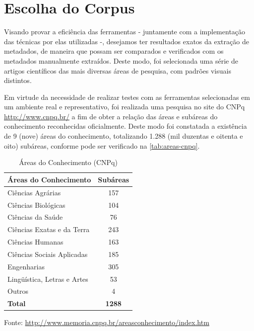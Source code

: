 \section{Escolha do Corpus}
\label{sec:corpus}


Visando provar a eficiência das ferramentas - juntamente com a implementação das técnicas por elas utilizadas -, desejamos ter resultados exatos da extração de metadados, de maneira que possam ser comparados e verificados com os metadados manualmente extraídos. Deste modo, foi selecionada uma série de artigos científicos das mais diversas áreas de pesquisa, com padrões visuais distintos.


Em virtude da necessidade de realizar testes com as ferramentas selecionadas em um ambiente real e representativo, foi realizada uma pesquisa no site do CNPq \url{http://www.cnpq.br/} a fim de obter a relação das áreas e subáreas do conhecimento reconhecidas oficialmente. Deste modo foi constatada a existência de 9 (nove) áreas do conhecimento, totalizando 1.288 (mil duzentas e oitenta e oito) subáreas, conforme pode ser verificado na \autoref{tab:areas-cnpq}.

\begin{table}
    \caption{Áreas do Conhecimento (CNPq)}
    \begin{center}
        \begin{tabular}{|l|c|}
            \hline 
            \textbf{Áreas do Conhecimento} & \textbf{Subáreas} \\ 
            \hline 
            Ciências Agrárias & 157 \\
            Ciências Biológicas & 104 \\
            Ciências da Saúde & 76 \\
            Ciências Exatas e da Terra & 243 \\
            Ciências Humanas & 163 \\
            Ciências Sociais Aplicadas & 185 \\
            Engenharias & 305 \\
            Lingüística, Letras e Artes & 53 \\
            Outros & 4 \\
            \hline
            \textbf{Total} & \textbf{1288} \\
            \hline
        \end{tabular}
    \end{center}
    \center\footnotesize{Fonte: \url{http://www.memoria.cnpq.br/areasconhecimento/index.htm}}
    \label{tab:areas-cnpq}
\end{table}

